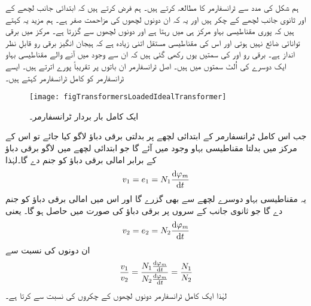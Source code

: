 ہم شکل   کی مدد سے ٹرانسفارمر کا مطالعہ کرتے ہیں۔  ہم فرض کرتے ہیں کہ ابتدائی جانب لچھے کے  اور ثانوی جانب لچھے کے  چکر ہیں اور یہ کہ ان  دونوں لچھوں کی مزاحمت صفر ہے۔ ہم مزید یہ کہتے ہیں کہ پوری مقناطیسی بہاو  مرکز ہی میں رہتا ہے اور دونوں لچھوں سے گزرتا ہے۔ مرکز میں برقی توانائی ضائع نہیں ہوتی اور اس کی مقناطیسی مستقل اتنی زیادہ ہے کہ ہیجان انگیز برقی رو قابلِ نظر انداز ہے۔ برقی رو   اور  کی سمتیں یوں رکھی گئی ہیں کہ ان سے وجود میں آنے والے مقناطیسی بہاو ایک دوسرے کی اُلٹ سمتوں میں  ہیں۔ اصل ٹرانسفارمر ان باتوں پر تقریباً پورے اترتے ہیں۔ ایسے ٹرانسفارمر کو کامل ٹرانسفارمر  کہتے ہیں۔
\begin{figure}
\centering
\texttt{[image: figTransformersLoadedIdealTransformer]}
\caption{ایک کامل بار بردار ٹرانسفارمر۔}
\label{شکل_ٹرانسفارمر_کامل_بار_بردار_ٹرانسفارمر}
\end{figure}

جب اس کامل ٹرانسفارمر کے ابتدائی لچھے پر بدلتی برقی دباؤ  لاگو کیا جائے تو اس کے مرکز میں بدلتا مقناطیسی بہاو   وجود میں  آئے گا جو ابتدائی لچھے میں   لاگو برقی دباؤ  کے برابر امالی برقی دباؤ  کو جنم دے گا۔لہٰذا
\begin{align}
v_1=e_1=N_1 \frac{\dif \varphi_m}{\dif t}
\end{align}
یہ مقناطیسی بہاو دوسرے لچھے سے بھی گزرے گا اور اس میں  امالی برقی دباؤ کو جنم دے گا جو ثانوی جانب کے سروں پر برقی دباؤ   کی صورت میں حاصل ہو گا۔ یعنی
\begin{align}
v_2=e_2=N_2 \frac{\dif \varphi_m}{\dif t}
\end{align}
ان دونوں کی نسبت سے
\begin{align}\label{مساوات_ٹرانسفارمر_تبادلہ_دباؤ}
\frac{v_1}{v_2}=\frac{N_1 \frac{\dif \varphi_m}{\dif t}}{N_2 \frac{\dif \varphi_m}{\dif t}}=\frac{N_1}{N_2}
\end{align}
لہٰذا ایک کامل ٹرانسفارمر دونوں لچھوں کے چکروں کی نسبت سے  کرتا ہے۔

